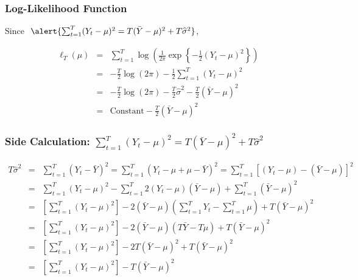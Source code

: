 \begin{frame}
  \frametitle{Log-Likelihood Function}

  Since $\; \alert{\sum_{t=1}^T (Y_t -\mu)^2 = T(\bar{Y} - \mu)^2 + T \widehat{\sigma}^2}$,

\begin{eqnarray*}
	\ell_T(\mu)&=& \sum_{t=1}^T \log \left( \frac{1}{2\pi} \exp \left\{-\frac{1}{2}(Y_t - \mu)^2 \right\}\right)\\
  &=& -\frac{T}{2} \log\left( 2\pi \right) - \frac{1}{2} \sum_{t=1}^{T} (Y_t - \mu)^2\\
  &=& -\frac{T}{2} \log\left( 2\pi \right) - \frac{T}{2} \widehat{\sigma}^2 - \frac{T}{2}(\bar{Y} - \mu)^2\\
  &=& \text{Constant} - \frac{T}{2}(\bar{Y} - \mu)^2
\end{eqnarray*}

\end{frame}
\begin{frame}
  \frametitle{Side Calculation: \normalsize $\sum_{t=1}^T (Y_t -\mu)^2 = T(\bar{Y} - \mu)^2 + T \widehat{\sigma}^2$}

\scriptsize
\begin{eqnarray*}
  T\widehat{\sigma}^2 &=& \sum_{t=1}^T \left(Y_t - \bar{Y}\right)^2 = \sum_{t=1}^T \left(Y_t - \mu + \mu - \bar{Y}\right)^2 = \sum_{t=1}^T \left[(Y_t -\mu) - (\bar{Y} - \mu)\right]^2\\
		&=&\sum_{t=1}^T (Y_t -\mu)^2 - \sum_{t=1}^T 2(Y_t -\mu)(\bar{Y} - \mu) + \sum_{t=1}^T (\bar{Y} - \mu)^2\\
				&=& \left[  \sum_{t=1}^T \left(Y_t - \mu\right)^2\right]   - 2(\bar{Y} - \mu) \left( \sum_{t=1}^T Y_t- \sum_{t=1}^T \mu \right)+T(\bar{Y} - \mu)^2\\
				&=& \left[  \sum_{t=1}^T \left(Y_t - \mu\right)^2\right]   - 2(\bar{Y} - \mu)(T\bar{Y}-T\mu)+T(\bar{Y} - \mu)^2\\
				&=&\left[  \sum_{t=1}^T \left(Y_t - \mu\right)^2\right]   - 2T(\bar{Y} - \mu)^2+T(\bar{Y} - \mu)^2\\
				&=&\left[  \sum_{t=1}^T \left(Y_t - \mu\right)^2\right]   - T(\bar{Y} - \mu)^2
\end{eqnarray*}
\end{frame}
